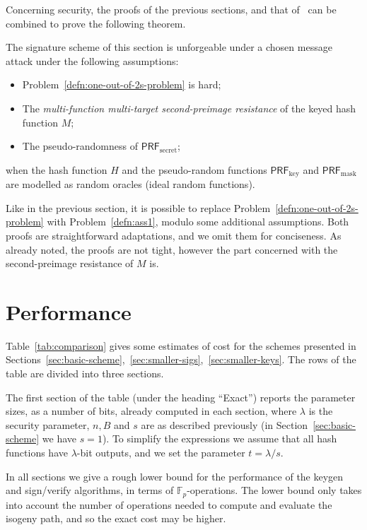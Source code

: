 \documentclass{llncs}
\newcommand{\F}{\mathbb{F}}
\newcommand{\PRF}{\mathsf{PRF}}
\newcommand{\PRFk}{\PRF_{\mathrm{key}}}
\newcommand{\PRFm}{\PRF_{\mathrm{mask}}}
\newcommand{\PRFs}{\PRF_{\mathrm{secret}}}
\begin{document}
Concerning security, the proofs of the previous sections, and that of~\cite[Appendix~B]{10.1007/978-3-662-49384-7_15} can be combined to prove the following theorem.

\begin{theorem}
  The signature scheme of this section is unforgeable under a chosen
  message attack under the following assumptions:
  \begin{itemize}
  \item Problem~\ref{defn:one-out-of-2s-problem} is hard;
  \item The \emph{multi-function multi-target second-preimage resistance} of
    the keyed hash function $M$;
  \item The pseudo-randomness of $\PRFs$;
  \end{itemize}
  when the hash function $H$ and the pseudo-random functions $\PRFk$
  and $\PRFm$ are modelled as random oracles (ideal random functions).
\end{theorem}

Like in the previous section, it is possible to replace Problem~\ref{defn:one-out-of-2s-problem} with Problem~\ref{defn:ass1}, modulo some additional assumptions.
Both proofs are straightforward adaptations, and we omit them for conciseness.
As already noted, the proofs are not tight, however the part concerned with the second-preimage resistance of $M$ is.


\section{Performance}


Table~\ref{tab:comparison} gives some estimates of cost for the schemes presented in Sections~\ref{sec:basic-scheme},~\ref{sec:smaller-sigs},~\ref{sec:smaller-keys}.
The rows of the table are divided into three sections.

The first section of the table (under the heading ``Exact'') reports the parameter sizes, as a number of bits, already computed in each section, where
$\lambda$ is the security parameter, $n,B$ and $s$ are as described previously (in Section~\ref{sec:basic-scheme} we have $s=1$).
To simplify the expressions we assume that all hash functions have $\lambda$-bit outputs, and we set the parameter $t=\lambda/s$.

In all sections we give a rough lower bound for the performance of the keygen and sign/verify algorithms, in terms of $\F_p$-operations.
The lower bound only takes into account the number of operations needed to compute and evaluate the isogeny path, and so the exact cost may be higher.
\end{document}
